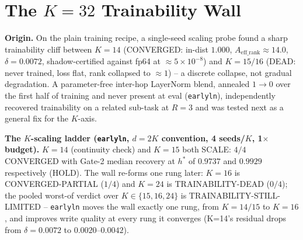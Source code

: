 \section{The $K{=}32$ Trainability Wall}
\label{sec:wall}

\textbf{Origin.} On the plain training recipe, a single-seed scaling probe
found a sharp trainability cliff between $K{=}14$ (CONVERGED: in-dist
$1.000$, $A_{\mathrm{eff\_rank}} \approx 14.0$, $\delta{=}0.0072$,
shadow-certified against fp64 at $\approx 5\times10^{-8}$) and $K{=}15/16$
(DEAD: never trained, loss flat, rank collapsed to $\approx 1$) -- a
discrete collapse, not gradual degradation.
A parameter-free inter-hop LayerNorm blend, annealed $1{\to}0$ over the
first half of training and never present at eval (\texttt{earlyln}),
independently recovered trainability on a related sub-task at $R{=}3$
and was tested next as a general fix for the $K$-axis.

\textbf{The $K$-scaling ladder (\texttt{earlyln}, $d{=}2K$ convention,
4 seeds/$K$, 1$\times$ budget).} $K{=}14$ (continuity check) and $K{=}15$
both SCALE: $4/4$ CONVERGED with Gate-2 median recovery at $h^\ast$ of
$0.9737$ and $0.9929$ respectively (HOLD). The wall re-forms one rung
later: $K{=}16$ is CONVERGED-PARTIAL ($1/4$) and $K{=}24$ is
TRAINABILITY-DEAD ($0/4$); the pooled worst-of verdict over
$K\in\{15,16,24\}$ is TRAINABILITY-STILL-LIMITED --
\texttt{earlyln} moves the wall exactly one rung, from
$K{=}14/15$ to $K{=}16$, and improves write quality at every rung it
converges (K=14's residual drops from $\delta{=}0.0072$ to
$0.0020$--$0.0042$). %

